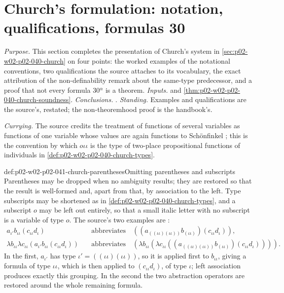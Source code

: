 \section{Church's formulation: notation, qualifications, formulas 30}
\label{sec:p02-w02-p02-041-church-supplement}

\emph{Purpose.}  This section completes the presentation of Church's system in
\cref{sec:p02-w02-p02-040-church} on four points: the worked examples of the
notational conventions, two qualifications the source attaches to its
vocabulary, the exact attribution of the non-definability remark about the
same-type predecessor, and a proof that not every formula 30\(^\alpha\) is a
theorem.  \emph{Inputs.}  
and \cref{thm:p02-w02-p02-040-church-soundness}.  \emph{Conclusions.}
.
\emph{Standing.}  Examples and qualifications are the source's, restated; the
non-theoremhood proof is the handbook's.

\emph{Currying.}  The source credits the treatment of functions of several
variables as functions of one variable whose values are again functions to
Sch\"onfinkel \cite[\S1, p.~57, n.~6]{Church1940}; this is the convention by
which \(o\iota\iota\) is the type of two-place propositional functions of
individuals in \cref{def:p02-w02-p02-040-church-types}.

\begin{hbexample}{def:p02-w02-p02-041-church-parentheses}{Omitting parentheses and subscripts}
Parentheses may be dropped when no ambiguity results; they are restored so
that the result is well-formed and, apart from that, by association to the
left.  Type subscripts may be shortened as in
\cref{def:p02-w02-p02-040-church-types}, and a subscript \(o\) may be left
out entirely, so that a small italic letter with no subscript is a variable of
type \(o\).  The source's two examples are \cite[\S2, p.~58]{Church1940}:
\[
\begin{aligned}
 a_{\iota'}b_{\iota\iota}(c_{\iota\iota}d_\iota)
 &\quad\text{abbreviates}\quad
 ((a_{((\iota\iota)(\iota\iota))}b_{(\iota\iota)})(c_{\iota\iota}d_\iota)),\\
 \lambda b_{\iota\iota}\lambda c_{\iota\iota}(a_{\iota'}b_{\iota\iota}(c_{\iota\iota}d_\iota))
 &\quad\text{abbreviates}\quad
 (\lambda b_{\iota\iota}(\lambda c_{\iota\iota}((a_{((\iota\iota)(\iota\iota))}b_{(\iota\iota)})(c_{\iota\iota}d_\iota)))).
\end{aligned}
\]
In the first, \(a_{\iota'}\) has type \(\iota'=((\iota\iota)(\iota\iota))\), so
it is applied first to \(b_{\iota\iota}\), giving a formula of type
\(\iota\iota\), which is then applied to \((c_{\iota\iota}d_\iota)\), of type
\(\iota\); left association produces exactly this grouping.  In the second the
two abstraction operators are restored around the whole remaining formula.
\end{hbexample}

